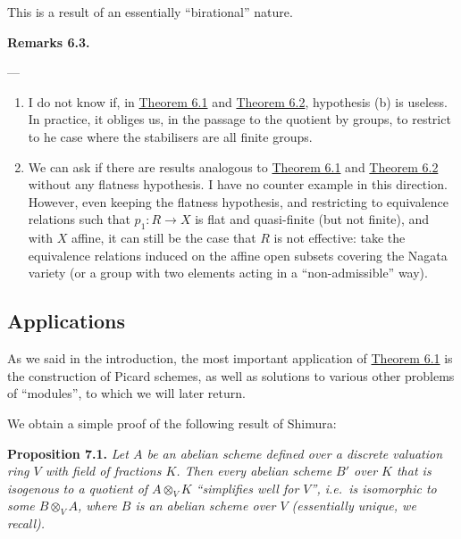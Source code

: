 \documentclass{article}
\newenvironment{itenv}[1]
  {\phantomsection\par\smallskip\noindent\textbf{#1.}\itshape}
  {\par\smallskip}
\newenvironment{rmenv}[1]
  {\phantomsection\par\smallskip\noindent\textbf{#1.}\rmfamily}
  {\par\smallskip}
\newcommand{\oldpage}[1]{\marginpar{\footnotesize$\Big\vert$ \textit{p.~#1}}}
\theoremstyle{definition}
\theoremstyle{definition}
\theoremstyle{definition}
\theoremstyle{definition}
\theoremstyle{remark}
\begin{document}
\oldpage{212-16}This is a result of an essentially ``birational'' nature.

\hypertarget{fga-3-iii-remarks-6.3}{}
\begin{rmenv}{Remarks 6.3}

---

\begin{enumerate}
\def\labelenumi{\arabic{enumi}.}
\item
  I do not know if, in \protect\hyperlink{fga-3-iii-theorem-6.1}{Theorem 6.1} and \protect\hyperlink{fga-3-iii-theorem-6.2}{Theorem 6.2}, hypothesis (b) is useless.
  In practice, it obliges us, in the passage to the quotient by groups, to restrict to he case where the stabilisers are all finite groups.
\item
  We can ask if there are results analogous to \protect\hyperlink{fga-3-iii-theorem-6.1}{Theorem 6.1} and \protect\hyperlink{fga-3-iii-theorem-6.2}{Theorem 6.2} without any flatness hypothesis.
  I have no counter example in this direction.
  However, even keeping the flatness hypothesis, and restricting to equivalence relations such that \(p_1\colon R\to X\) is flat and quasi-finite (but not finite), and with \(X\) affine, it can still be the case that \(R\) is not effective: take the equivalence relations induced on the affine open subsets covering the Nagata variety (or a group with two elements acting in a ``non-admissible'' way).
\end{enumerate}

\end{rmenv}

\hypertarget{fga-3-iii-section-7}{%
\subsection{Applications}\label{fga-3-iii-section-7}}

As we said in the introduction, the most important application of \protect\hyperlink{fga-3-iii-theorem-6.1}{Theorem 6.1} is the construction of Picard schemes, as well as solutions to various other problems of ``modules'', to which we will later return.

We obtain a simple proof of the following result of Shimura:

\leavevmode{}%
\begin{itenv}{Proposition 7.1}
Let \(A\) be an abelian scheme defined over a discrete valuation ring \(V\) with field of fractions \(K\).
Then every abelian scheme \(B'\) over \(K\) that is isogenous to a quotient of \(A\otimes_V K\) ``simplifies well for \(V\)'', i.e.~is isomorphic to some \(B\otimes_V A\), where \(B\) is an abelian scheme over \(V\) (essentially unique, we recall).

\end{itenv}
\end{document}
